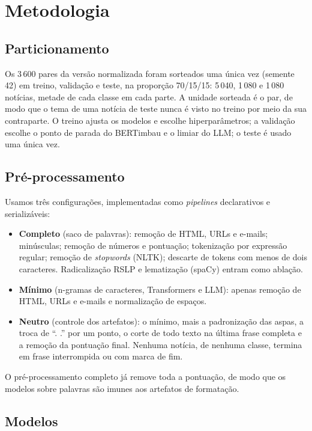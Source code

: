 \section{Metodologia}

\subsection{Particionamento}

Os 3\,600 pares da versão normalizada foram sorteados uma única vez (semente 42) em treino, validação e teste, na proporção 70/15/15: 5\,040, 1\,080 e 1\,080 notícias, metade de cada classe em cada parte. A unidade sorteada é o par, de modo que o tema de uma notícia de teste nunca é visto no treino por meio da sua contraparte. O treino ajusta os modelos e escolhe hiperparâmetros; a validação escolhe o ponto de parada do BERTimbau e o limiar do LLM; o teste é usado uma única vez.

\subsection{Pré-processamento}

Usamos três configurações, implementadas como \emph{pipelines} declarativos e serializáveis:
\begin{itemize}
\item \textbf{Completo} (saco de palavras): remoção de HTML, URLs e e-mails; minúsculas; remoção de números e pontuação; tokenização por expressão regular; remoção de \emph{stopwords} (NLTK); descarte de tokens com menos de dois caracteres. Radicalização RSLP \citep{orengo2001} e lematização (spaCy) entram como ablação.
\item \textbf{Mínimo} (n-gramas de caracteres, Transformers e LLM): apenas remoção de HTML, URLs e e-mails e normalização de espaços.
\item \textbf{Neutro} (controle dos artefatos): o mínimo, mais a padronização das aspas, a troca de ``. .'' por um ponto, o corte de todo texto na última frase completa e a remoção da pontuação final. Nenhuma notícia, de nenhuma classe, termina em frase interrompida ou com marca de fim.
\end{itemize}
O pré-processamento completo já remove toda a pontuação, de modo que os modelos sobre palavras são imunes aos artefatos de formatação.

\subsection{Modelos}

